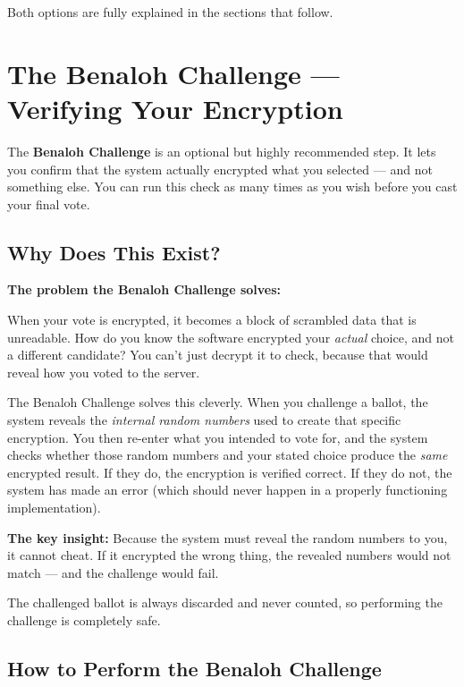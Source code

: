 \documentclass[12pt,a4paper,openany]{book}
\begin{document}
Both options are fully explained in the sections that follow.

\chapter{The Benaloh Challenge --- Verifying Your Encryption}
\label{ch:benaloh}

The \textbf{Benaloh Challenge} is an optional but highly recommended step. It lets you confirm that the system actually encrypted what you selected --- and not something else. You can run this check as many times as you wish before you cast your final vote.

\section{Why Does This Exist?}

\begin{tcolorbox}[conceptbox]
	\textbf{The problem the Benaloh Challenge solves:}

	When your vote is encrypted, it becomes a block of scrambled data that is unreadable. How do you know the software encrypted your \emph{actual} choice, and not a different candidate? You can't just decrypt it to check, because that would reveal how you voted to the server.

	The Benaloh Challenge solves this cleverly. When you challenge a ballot, the system reveals the \emph{internal random numbers} used to create that specific encryption. You then re-enter what you intended to vote for, and the system checks whether those random numbers and your stated choice produce the \emph{same} encrypted result. If they do, the encryption is verified correct. If they do not, the system has made an error (which should never happen in a properly functioning implementation).

	\textbf{The key insight:} Because the system must reveal the random numbers to you, it cannot cheat. If it encrypted the wrong thing, the revealed numbers would not match --- and the challenge would fail.

	The challenged ballot is always discarded and never counted, so performing the challenge is completely safe.
\end{tcolorbox}

\section{How to Perform the Benaloh Challenge}
\end{document}
